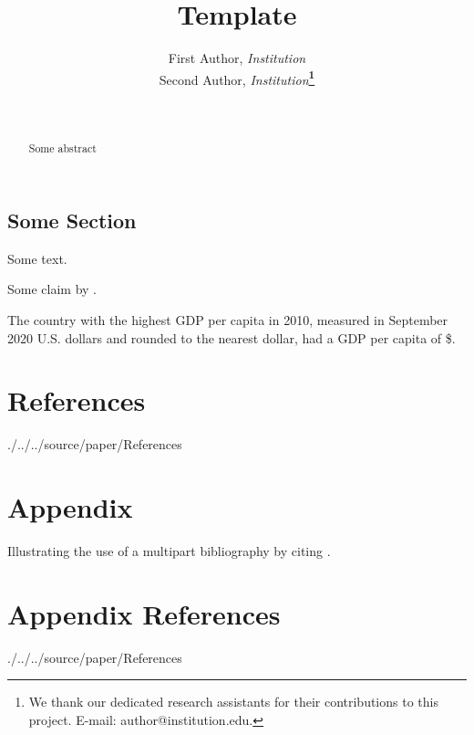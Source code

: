 \documentclass[12pt]{article}
\newcommand*{\dir}{.}
\renewcommand*{\dir}{./../..}
\begin{document}
\title{Template}
\author{First Author, \emph{Institution}\\
Second Author, \emph{Institution}\textbf{\thanks{We thank our dedicated research assistants for their contributions
to this project. E-mail: author@institution.edu.}}}
\date{\monthname\ \number\year}
\maketitle
\begin{abstract}
\noindent Some abstract
\end{abstract}
\begin{btUnit}

\begin{spacing}{1.32}

\section{Some Section}

Some text.

Some claim by \citet{gentzkow2010drives}. 

The country with the highest GDP per capita in 2010, measured in September 2020 U.S. dollars and rounded to the nearest dollar, had a GDP per capita of \$\TopGDPValue. 

\end{spacing}

\newpage{}



\newpage{}



\section*{References}

\begin{btSect}[chicago]{\dir/source/paper/References}
\btPrintCited
\end{btSect}

\end{btUnit}

\appendix

\section*{Appendix}

\begin{btUnit}

Illustrating the use of a multipart bibliography by citing \citet{gentzkow2011ideological}.

\section*{Appendix References}

\begin{btSect}[chicago]{\dir/source/paper/References}
\btPrintCited
\end{btSect}

\end{btUnit}
\end{document}
